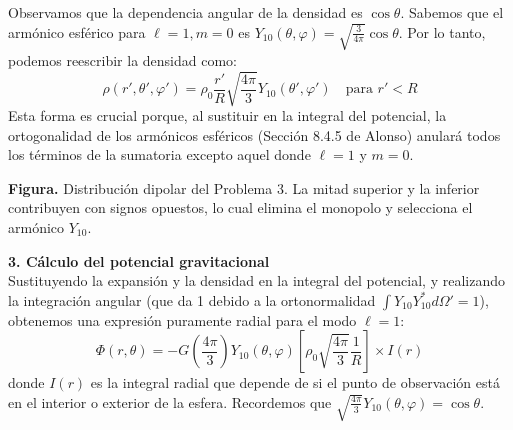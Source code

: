 \documentclass[a4paper]{article}
\begin{document}
Observamos que la dependencia angular de la densidad es $\cos\theta$. Sabemos que el armónico esférico para $\ell=1, m=0$ es $Y_{10}(\theta, \varphi) = \sqrt{\frac{3}{4\pi}} \cos\theta$. Por lo tanto, podemos reescribir la densidad como:
$$
\rho(r', \theta', \varphi') = \rho_0 \frac{r'}{R} \sqrt{\frac{4\pi}{3}} Y_{10}(\theta', \varphi') \quad \text{para } r' < R
$$
Esta forma es crucial porque, al sustituir en la integral del potencial, la ortogonalidad de los armónicos esféricos (Sección 8.4.5 de Alonso) anulará todos los términos de la sumatoria excepto aquel donde $\ell=1$ y $m=0$.

\begin{center}

\par\smallskip
{\small\textbf{Figura.} Distribución dipolar del Problema 3. La mitad superior y la inferior contribuyen con signos opuestos, lo cual elimina el monopolo y selecciona el armónico $Y_{10}$.}
\end{center}

\vspace{0.3cm}
\noindent\textbf{3. Cálculo del potencial gravitacional} \\
Sustituyendo la expansión y la densidad en la integral del potencial, y realizando la integración angular (que da 1 debido a la ortonormalidad $\int Y_{10} Y_{10}^* d\Omega' = 1$), obtenemos una expresión puramente radial para el modo $\ell=1$:
$$
\Phi(r, \theta) = -G \left( \frac{4\pi}{3} \right) Y_{10}(\theta, \varphi) \left[ \rho_0 \sqrt{\frac{4\pi}{3}} \frac{1}{R} \right] \times I(r)
$$
donde $I(r)$ es la integral radial que depende de si el punto de observación está en el interior o exterior de la esfera. Recordemos que $\sqrt{\frac{4\pi}{3}} Y_{10}(\theta, \varphi) = \cos\theta$.
\end{document}
